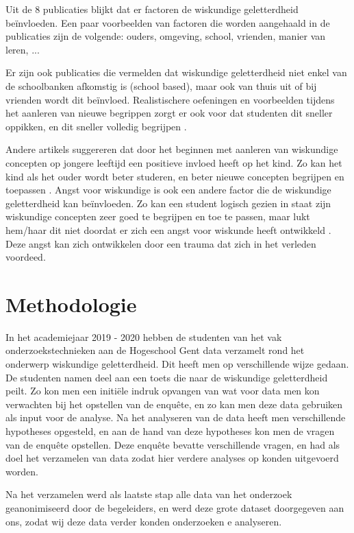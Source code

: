 \documentclass{hogent-article}
\begin{document}
Uit de 8 publicaties blijkt dat er factoren de wiskundige geletterdheid beïnvloeden. Een paar voorbeelden van factoren die worden aangehaald in de publicaties zijn de volgende: ouders, omgeving, school, vrienden, manier van leren, ... \autocite{Sosnowski2017}

Er zijn ook publicaties \autocite{Brum2007} die vermelden dat wiskundige geletterdheid niet enkel van de schoolbanken afkomstig is (school based), maar ook van thuis uit of bij vrienden wordt dit beïnvloed. Realistischere oefeningen en voorbeelden tijdens het aanleren van nieuwe begrippen zorgt er ook voor dat studenten dit sneller oppikken, en dit sneller volledig begrijpen \autocite{Vithal2006}.  


Andere artikels suggereren dat door het beginnen met aanleren van wiskundige concepten op jongere leeftijd een positieve invloed heeft op het kind. Zo kan het kind als het ouder wordt beter studeren, en beter nieuwe concepten begrijpen en toepassen \autocite{Vrijmoeth2010}. Angst voor wiskundige is ook een andere factor die de wiskundige geletterdheid kan beïnvloeden. Zo kan een student logisch gezien in staat zijn wiskundige concepten zeer goed te begrijpen en toe te passen, maar lukt hem/haar dit niet doordat er zich een angst voor wiskunde heeft ontwikkeld \autocite{Joseph2017}. Deze angst kan zich ontwikkelen door een trauma dat zich in het verleden voordeed. 



\section{Methodologie}

In het academiejaar 2019 - 2020 hebben de studenten van het vak onderzoekstechnieken aan de Hogeschool Gent data verzamelt rond het onderwerp wiskundige geletterdheid. Dit heeft men op verschillende wijze gedaan. De studenten namen deel aan een toets die naar de wiskundige geletterdheid peilt. Zo kon men een initiële indruk opvangen van wat voor data men kon verwachten bij het opstellen van de enquête, en zo kan men deze data gebruiken als input voor de analyse. Na het analyseren van de data heeft men verschillende hypotheses opgesteld, en aan de hand van deze hypotheses kon men de vragen van de enquête opstellen. Deze enquête bevatte verschillende vragen, en had als doel het verzamelen van data zodat hier verdere analyses op konden uitgevoerd worden.

Na het verzamelen werd als laatste stap alle data van het onderzoek geanonimiseerd door de begeleiders, en werd deze grote dataset doorgegeven aan ons, zodat wij deze data verder konden onderzoeken e analyseren. 
\end{document}
